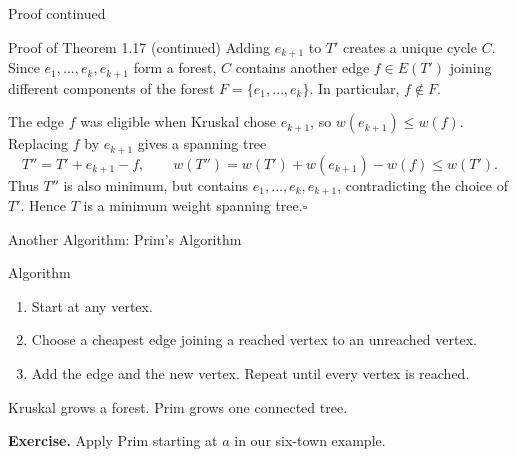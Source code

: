 \documentclass[aspectratio=169,11pt]{beamer}
\begin{document}
\begin{frame}[t]{Proof continued}
\begin{block}{Proof of Theorem 1.17 (continued)}
\small
Adding $e_{k+1}$ to $T'$ creates a unique cycle $C$. Since $e_1,\ldots,e_k,e_{k+1}$ form a forest, $C$ contains another edge $f\in E(T')$ joining different components of the forest $F=\{e_1,\ldots,e_k\}$. In particular, $f\notin F$.
\par\smallskip
The edge $f$ was eligible when Kruskal chose $e_{k+1}$, so $w(e_{k+1})\le w(f)$. Replacing $f$ by $e_{k+1}$ gives a spanning tree
\[
T''=T'+e_{k+1}-f,\qquad w(T'')=w(T')+w(e_{k+1})-w(f)\le w(T').
\]
Thus $T''$ is also minimum, but contains $e_1,\ldots,e_k,e_{k+1}$, contradicting the choice of $T'$. Hence $T$ is a minimum weight spanning tree.\hfill$\square$
\end{block}
\smallskip
{\centering
{}\par}
\end{frame}


\begin{frame}{Another Algorithm: Prim's Algorithm}
\normalsize
\begin{block}{Algorithm}
\begin{enumerate}
\setlength{\itemsep}{0.22cm}
\item Start at any vertex.
\item Choose a cheapest edge joining a reached vertex to an unreached vertex.
\item Add the edge and the new vertex. Repeat until every vertex is reached.
\end{enumerate}
\end{block}
\par\medskip Kruskal grows a forest. Prim grows one connected tree.\par\medskip\textbf{Exercise.} Apply Prim starting at $a$ in our six-town example.
\end{frame}
\end{document}
